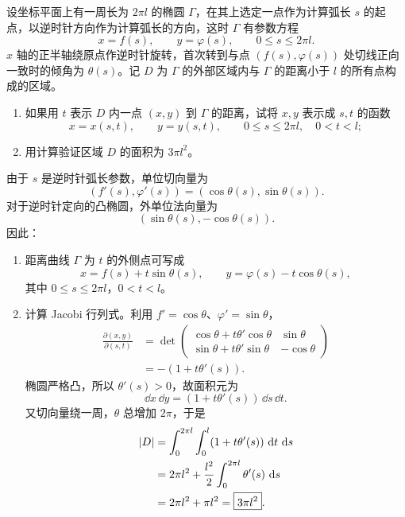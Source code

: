 \begin{xreferenceproblem}[15]
设坐标平面上有一周长为 $2\pi l$ 的椭圆 $\Gamma$，在其上选定一点作为计算弧长 $s$ 的起点，以逆时针方向作为计算弧长的方向，这时 $\Gamma$ 有参数方程
  \[
    x=f(s),\qquad y=\varphi(s),\qquad0\le s\le2\pi l.
  \]
  $x$ 轴的正半轴绕原点作逆时针旋转，首次转到与点 $(f(s),\varphi(s))$ 处切线正向一致时的倾角为 $\theta(s)$。记 $D$ 为 $\Gamma$ 的外部区域内与 $\Gamma$ 的距离小于 $l$ 的所有点构成的区域。
  \begin{enumerate}[label=(\arabic*)]
    \item 如果用 $t$ 表示 $D$ 内一点 $(x,y)$ 到 $\Gamma$ 的距离，试将 $x,y$ 表示成 $s,t$ 的函数
    \[
      x=x(s,t),\qquad y=y(s,t),\qquad0\le s\le2\pi l,\quad0<t<l;
    \]
    \item 用计算验证区域 $D$ 的面积为 $3\pi l^2$。
  \end{enumerate}
\end{xreferenceproblem}
\begin{xsolution}
由于 $s$ 是逆时针弧长参数，单位切向量为
\[
  (f'(s),\varphi'(s))=(\cos\theta(s),\sin\theta(s)).
\]
对于逆时针定向的凸椭圆，外单位法向量为
\[
  (\sin\theta(s),-\cos\theta(s)).
\]
因此：
\begin{enumerate}[label=(\arabic*)]
  \item 距离曲线 $\Gamma$ 为 $t$ 的外侧点可写成
  \[
    \boxed{
    x=f(s)+t\sin\theta(s),
    \qquad
    y=\varphi(s)-t\cos\theta(s)},
  \]
  其中 $0\le s\le2\pi l$，$0<t<l$。

  \item 计算 Jacobi 行列式。利用 $f'=\cos\theta$、$\varphi'=\sin\theta$，
  \begin{align*}
    \frac{\partial(x,y)}{\partial(s,t)}
    &=\det
    \begin{pmatrix}
      \cos\theta+t\theta'\cos\theta&\sin\theta\\
      \sin\theta+t\theta'\sin\theta&-\cos\theta
    \end{pmatrix}\\
    &=-(1+t\theta'(s)).
  \end{align*}
  椭圆严格凸，所以 $\theta'(s)>0$，故面积元为
  \[
    \dd x\,\dd y=(1+t\theta'(s))\,\dd s\,\dd t.
  \]
  又切向量绕一周，$\theta$ 总增加 $2\pi$，于是
  \begin{align*}
    \lvert D\rvert
    &=\int_0^{2\pi l}\int_0^l(1+t\theta'(s))\,\mathop{}\!\mathrm{d} t\,\mathop{}\!\mathrm{d} s\\
    &=2\pi l^2+\frac{l^2}{2}\int_0^{2\pi l}\theta'(s)\,\mathop{}\!\mathrm{d} s\\
    &=2\pi l^2+\pi l^2
    =\boxed{3\pi l^2}.
  \end{align*}
\end{enumerate}
\end{xsolution}


